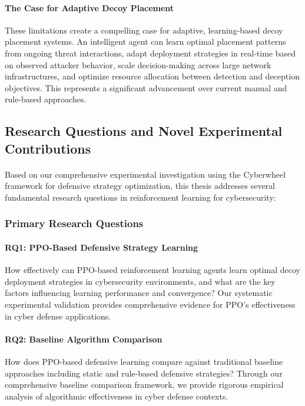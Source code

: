 \documentclass[12pt,oneside]{article}
\begin{document}
\paragraph{The Case for Adaptive Decoy Placement}

These limitations create a compelling case for adaptive, learning-based decoy placement systems. An intelligent agent can learn optimal placement patterns from ongoing threat interactions, adapt deployment strategies in real-time based on observed attacker behavior, scale decision-making across large network infrastructures, and optimize resource allocation between detection and deception objectives. This represents a significant advancement over current manual and rule-based approaches.

\subsection{Research Questions and Novel Experimental Contributions}

\paragraph{}Based on our comprehensive experimental investigation using the Cyberwheel framework for defensive strategy optimization, this thesis addresses several fundamental research questions in reinforcement learning for cybersecurity:

\subsubsection{Primary Research Questions}

\paragraph{RQ1: PPO-Based Defensive Strategy Learning} 
How effectively can PPO-based reinforcement learning agents learn optimal decoy deployment strategies in cybersecurity environments, and what are the key factors influencing learning performance and convergence? Our systematic experimental validation provides comprehensive evidence for PPO's effectiveness in cyber defense applications.

\paragraph{RQ2: Baseline Algorithm Comparison}
How does PPO-based defensive learning compare against traditional baseline approaches including static and rule-based defensive strategies? Through our comprehensive baseline comparison framework, we provide rigorous empirical analysis of algorithmic effectiveness in cyber defense contexts.
\end{document}
